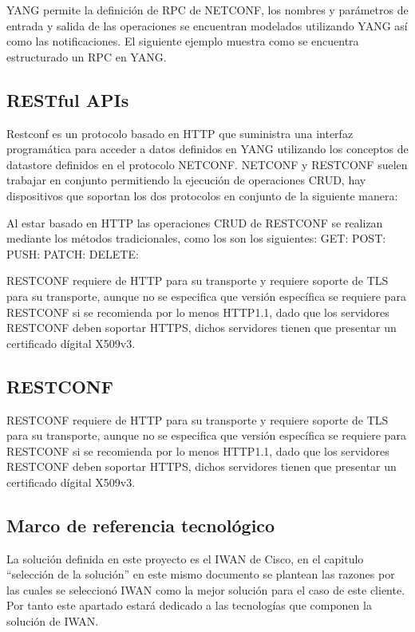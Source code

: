 YANG permite la definición de RPC de NETCONF, los nombres y parámetros de entrada y salida de las operaciones se encuentran modelados utilizando YANG así como las notificaciones. El siguiente ejemplo muestra como se encuentra estructurado un RPC en YANG.


\subsection{RESTful APIs}
\label{sec:RESTful APIs}

Restconf es un protocolo basado en HTTP que suministra una interfaz programática para acceder a datos definidos en YANG utilizando los conceptos de datastore definidos en el protocolo NETCONF.
NETCONF y RESTCONF suelen trabajar en conjunto permitiendo la ejecución de operaciones CRUD, hay dispositivos que soportan los dos protocolos  en conjunto de la siguiente manera:

Al estar basado en HTTP las operaciones CRUD de RESTCONF se realizan mediante los métodos tradicionales, como los son los siguientes:
GET:
POST:
PUSH:
PATCH:
DELETE:

RESTCONF requiere de HTTP para su transporte y requiere soporte de TLS para su transporte, aunque no se especifica que versión específica se requiere para RESTCONF si se recomienda por lo menos HTTP1.1, dado que los servidores RESTCONF deben soportar HTTPS, dichos servidores tienen que presentar un certificado dígital X509v3.

\subsection{RESTCONF}
\label{sec:RESTCONF}

RESTCONF requiere de HTTP para su transporte y requiere soporte de TLS para su transporte, aunque no se especifica que versión específica se requiere para RESTCONF si se recomienda por lo menos HTTP1.1, dado que los servidores RESTCONF deben soportar HTTPS, dichos servidores tienen que presentar un certificado dígital X509v3.

\subsection{Marco de referencia tecnológico}
\label{sec:Marco de referencia tecnológico}

La solución definida en este proyecto es el IWAN de Cisco, en el capitulo “selección de la solución” en este mismo documento se plantean las razones por las cuales se seleccionó IWAN como la mejor solución para el caso de este cliente. Por tanto este apartado estará dedicado a las tecnologías que componen la solución de IWAN.


